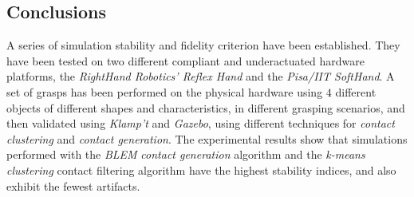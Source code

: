 \subsection{Conclusions}
\label{conclusions5}

A series of simulation stability and fidelity criterion have been established. They have been tested on two different compliant and underactuated hardware platforms, the \emph{RightHand Robotics' Reflex Hand} and the \emph{Pisa/IIT SoftHand}. A set of grasps has been performed on the physical hardware using $4$ different objects of different shapes and characteristics, in different grasping scenarios, and then validated using \emph{Klamp't} and \emph{Gazebo}, using different techniques for \emph{contact clustering} and \emph{contact generation}. The experimental results show that  simulations performed with the \emph{BLEM} \emph{contact generation} algorithm and the \emph{k-means clustering} contact filtering algorithm have the highest stability indices, and also exhibit the fewest artifacts.

